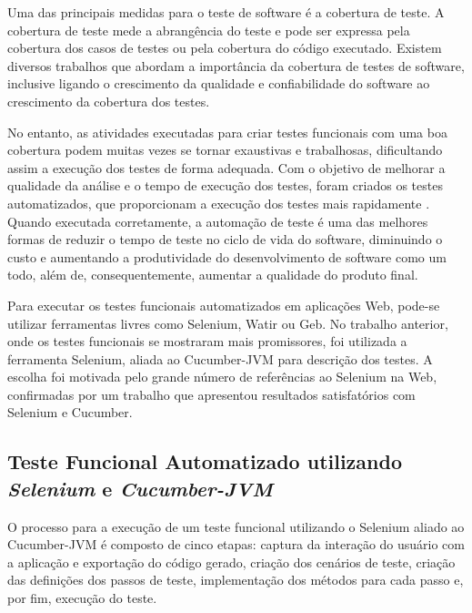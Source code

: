 \documentclass[12pt]{article}
\begin{document}
Uma das principais medidas para o teste de software é a cobertura de teste. A cobertura de teste mede a abrangência do teste e pode ser expressa pela cobertura dos casos de testes ou pela cobertura do código executado. Existem diversos trabalhos que abordam a importância da cobertura de testes de software\cite{zhu1997software,bieman1996using}, inclusive ligando o crescimento da qualidade e confiabilidade do software ao crescimento da cobertura dos testes\cite{malaiya2002software}.


No entanto, as atividades executadas para criar testes funcionais com uma boa cobertura podem muitas vezes se tornar exaustivas e trabalhosas, dificultando assim a execução dos testes de forma adequada. Com o objetivo de melhorar a qualidade da análise e o tempo de execução dos testes, foram criados os testes automatizados, que proporcionam a execução dos testes mais rapidamente \cite{fantinato2005autotest}. Quando executada corretamente, a automação de teste é uma das melhores formas de reduzir o tempo de teste no ciclo de vida do software, diminuindo o custo e aumentando a produtividade do desenvolvimento de software como um todo, além de, consequentemente, aumentar a qualidade do produto final.

Para executar os testes funcionais automatizados em aplicações Web, pode-se utilizar ferramentas livres como Selenium\cite{selenium}, Watir\cite{watir} ou Geb\cite{geb}. No trabalho anterior\cite{sbqs2015}, onde os testes funcionais se mostraram mais promissores, foi utilizada a ferramenta Selenium, aliada ao Cucumber-JVM\cite{cucumber} para descrição dos testes. A escolha foi motivada pelo grande número de referências ao Selenium na Web, confirmadas por um trabalho que apresentou resultados satisfatórios com Selenium e Cucumber\cite{pannutest,sbqs2013}.

\subsection{Teste Funcional Automatizado utilizando \emph{Selenium} e \emph{Cucumber-JVM}}
O processo para a execução de um teste funcional utilizando o Selenium aliado ao Cucumber-JVM é composto de cinco etapas: captura da interação do usuário com a aplicação e exportação do código gerado, criação dos cenários de teste, criação das definições dos passos de teste, implementação dos métodos para cada passo e, por fim, execução do teste.
\end{document}
